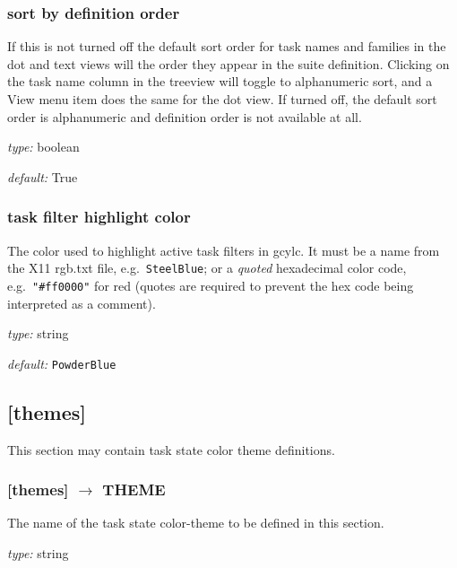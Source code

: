 \subsubsection{sort by definition order}

If this is not turned off the default sort order for task names and
families in the dot and text views will the order they appear in the
suite definition. Clicking on the task name column in the treeview will
toggle to alphanumeric sort, and a View menu item does the same for the
dot view.  If turned off, the default sort order is alphanumeric and
definition order is not available at all.

\begin{myitemize}
\item {\em type:} boolean
\item {\em default:} True
\end{myitemize}

\subsubsection{task filter highlight color}

The color used to highlight active task filters in gcylc. It must be a name
from the X11 rgb.txt file, e.g.\ \lstinline=SteelBlue=; or a
{\em quoted} hexadecimal color code, e.g.\ \lstinline="#ff0000"= for red (quotes
are required to prevent the hex code being interpreted as a comment).

\begin{myitemize}
    \item {\em type:} string
    \item {\em default:} \lstinline=PowderBlue=
\end{myitemize}

\subsection{[themes]}

This section may contain task state color theme definitions.

\subsubsection[THEME]{[themes] $\rightarrow$ THEME}

The name of the task state color-theme to be defined in this section.

\begin{myitemize}
\item {\em type:} string
\end{myitemize}

